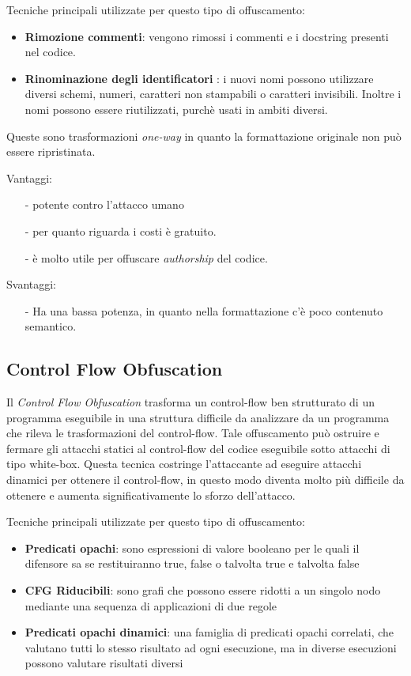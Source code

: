 \documentclass[a4paper,oneside,openright,titlepage,10pt,footinclude,headinclude]{scrbook}
\begin{document}
\noindent Tecniche principali utilizzate per questo tipo di offuscamento:
\begin{itemize}
\item
\textbf{Rimozione commenti}: vengono rimossi i commenti e i docstring presenti nel codice.
\item
\textbf{Rinominazione degli identificatori }: i nuovi nomi possono utilizzare diversi schemi, numeri, caratteri non stampabili o caratteri invisibili. Inoltre i nomi possono essere riutilizzati, purchè usati in ambiti diversi.
\end{itemize}

\noindent Queste sono trasformazioni \emph{one-way} in quanto la formattazione originale non può essere ripristinata.\medskip

Vantaggi: 
\begin{itemize}
\item[-]
potente contro l'attacco umano
\item[-]
per quanto riguarda i costi è gratuito.
\item[-]
è molto utile per offuscare \emph{authorship} del codice.
\end{itemize}

Svantaggi:
\begin{itemize}
\item[-]
Ha una bassa potenza, in quanto nella formattazione c'è poco contenuto semantico. 
\end{itemize}


\subsection{Control Flow Obfuscation}
Il \emph{Control Flow Obfuscation} trasforma un control-flow ben strutturato di un programma eseguibile in una struttura difficile da analizzare da un programma che rileva le trasformazioni del control-flow. Tale offuscamento può ostruire e fermare gli attacchi statici al control-flow del codice eseguibile sotto attacchi di tipo white-box. Questa tecnica costringe l'attaccante ad eseguire attacchi dinamici per ottenere il control-flow, in questo modo diventa molto più difficile da ottenere e aumenta significativamente lo sforzo dell'attacco.

\noindent Tecniche principali utilizzate per questo tipo di offuscamento:
\begin{itemize}
\item
\textbf{Predicati opachi}: sono espressioni di valore booleano per le quali il difensore sa se restituiranno true, false o talvolta true e talvolta false
\item
\textbf{CFG Riducibili}: sono grafi che possono essere ridotti a un singolo nodo mediante una sequenza di applicazioni di due regole
\item
\textbf{Predicati opachi dinamici}: una famiglia di predicati opachi correlati, che valutano tutti lo stesso risultato ad ogni esecuzione, ma in diverse esecuzioni possono valutare risultati diversi
\end{itemize}
\end{document}
